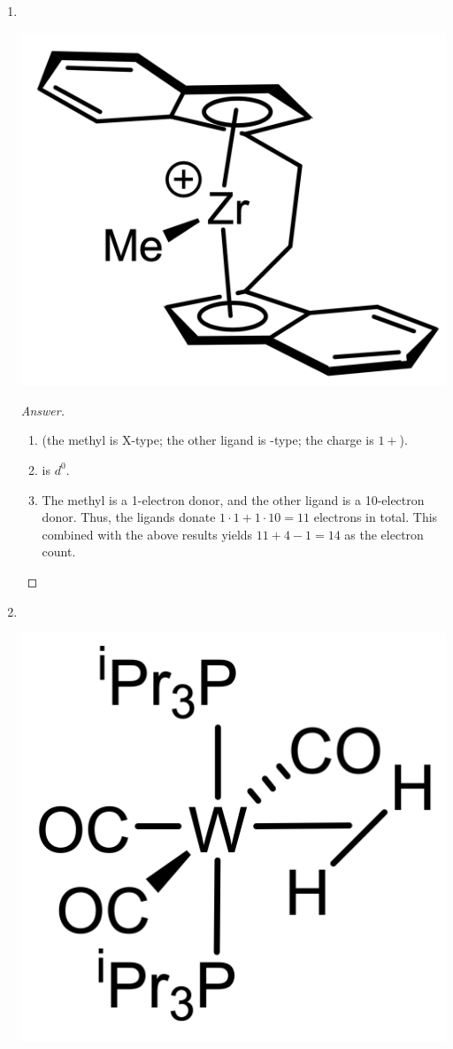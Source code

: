 \documentclass[../psets.tex]{subfiles}
\begin{document}
\begin{enumerate}
\begin{enumerate}[label={\arabic*)}]
\begin{center}
        \end{center}
        \begin{proof}[Answer]\leavevmode
            \begin{enumerate}[label={(\roman*)}]
                \item {} (the carbonyl is L-type; each iodide is X-type; the other ligand is X-type; the charge is $1-$).
                \item {} is $d^6$.
                \item The carbonyl is a 2-electron donor, each iodide is a 1-electron donor, and the other ligand is a 1-electron donor. Thus, the ligands donate $1\cdot 2+3\cdot 1+1\cdot 1=6$ electrons in total. This combined with the above results yields $6+9-(-1)=16$ as the electron count.
            \end{enumerate}
        \end{proof}
        \item ${\color{white}hi}$
        \begin{center}
            \includegraphics[width=0.25\linewidth]{../ExtFiles/pset1-1-08.png}
        \end{center}
        \begin{proof}[Answer]\leavevmode
            \begin{enumerate}[label={(\roman*)}]
                \item {} (the methyl is X-type; the other ligand is -type; the charge is $1+$).
                \item {} is $d^0$.
                \item The methyl is a 1-electron donor, and the other ligand is a 10-electron donor. Thus, the ligands donate $1\cdot 1+1\cdot 10=11$ electrons in total. This combined with the above results yields $11+4-1=14$ as the electron count.
            \end{enumerate}
        \end{proof}
        \item ${\color{white}hi}$
        \begin{center}
            \includegraphics[width=0.18\linewidth]{../ExtFiles/pset1-1-09.png}

\end{center}
\end{enumerate}
\end{enumerate}
\end{document}

